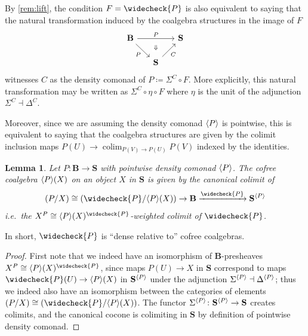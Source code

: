 \documentclass[11pt, oneside, article]{memoir}
\theoremstyle{plain}
\newtheorem{lemma}[theorem]{Lemma}
\theoremstyle{definition}
\theoremstyle{remark}
\newenvironment{remark}
{\renewcommand\qedsymbol{$\lrcorner$}%
  \pushQED{\qed}\myremark}
{\popQED\endmyremark}
\DeclareMathOperator*{\colim}{colim}
\DeclarePairedDelimiter{\gen}{\langle}{\rangle}
\newcommand{\xto}[1]{\xrightarrow{#1}}
\newcommand{\cat}[1]{\mathbf{#1}}
\newcommand{\CoalgOn}[2]{{#2}^{#1}}
\newcommand{\CoalgS}[1]{\CoalgOn{#1}{\bS}}
\newcommand{\lift}[1]{\widecheck{#1}}
\newcommand{\carr}{\Sigma}
\newcommand{\rcarr}{\Delta}
\newcommand{\car}[1]{\carr^{#1}}
\newcommand{\rcar}[1]{\rcarr^{#1}}
\newcommand{\carC}{\car{\cC}}
\newcommand{\rcarC}{\rcar{\cC}}
\newcommand{\carP}{\car{\cP}}
\newcommand{\rcarP}{\rcar{\cP}}
\newcommand{\ph}[1]{#1}
\newcommand{\cmnd}[1]{{#1}}
\newcommand{\xU}{U}
\newcommand{\xV}{V}
\newcommand{\xX}{X}
\newcommand{\cC}{\cmnd{C}}
\newcommand{\bB}{\cat{B}}
\newcommand{\bS}{\cat{S}}
\newcommand{\pP}{\ph{P}}
\newcommand{\cP}{\gen{\pP}}
\newcommand{\lP}{\lift{\pP}}
\newcommand{\CS}{\CoalgS{\cC}}
\newcommand{\PS}{\CoalgS{\cP}}
\begin{document}
\begin{remark}\label{rem:subbasismodule}
  By \cref{rem:lift}, the condition $F = \lP$ is also equivalent to
  saying that the
  natural transformation induced by the coalgebra structures in the
  image of $F$
  \[
    \begin{tikzcd}[column sep=15pt, row sep=15pt]
      {\bB} &{}& {\bS} \\
      & {\bS}
      \arrow["\pP", from=1-1, to=1-3]
      \arrow["\pP"', from=1-1, to=2-2]
      \arrow["\cC"', from=2-2, to=1-3]
      \arrow["\Downarrow"{description, pos=0.3}, draw=none, from=1-2, to=2-2]
    \end{tikzcd}
  \]
  witnesses $\cC$ as the density comonad of
  $\pP \coloneqq \carC \circ F$. More explicitly, this natural
  transformation may be written as $\carC \circ \eta \circ F$ where
  $\eta$ is the unit of the adjunction $\carC \dashv \rcarC$.

  Moreover, since we are assuming the density comonad $\cP$ is
  pointwise, this is equivalent to saying that the coalgebra
  structures are given by the colimit inclusion maps
  $\pP(\xU) \to \colim_{\pP(\xV) \to \pP(\xU)} \pP(\xV)$ indexed by
  the identities.
\end{remark}


\begin{lemma}\label{lem:cofreecolimit}
  Let $\pP \colon \bB \to \bS$ with pointwise density comonad
  $\cP$. The cofree coalgebra $\cP(\xX)$ on an object $\xX$ in $\bS$ is
  given by the canonical colimit of
  \[(\pP / \xX) \cong (\lP / \cP(\xX)) \to \bB \xto{\lP} \PS\] i.e.\
  the $\xX^\pP \cong \cP(\xX)^{\lP}$-weighted colimit of $\lP$.
\end{lemma}

\noindent
In short, $\lP$ is ``dense relative to'' cofree coalgebras.

\begin{proof}
  First note that we indeed have an isomorphism of $\bB$-presheaves
  $\xX^\pP \cong \cP(\xX)^{\lP}$, since maps $\pP(\xU) \to \xX$ in
  $\bS$ correspond to maps $\lP(\xU) \to \cP(\xX)$ in $\PS$ under the
  adjunction $\carP \dashv \rcarP$; thus we indeed also have an
  isomorphism between the categories of elements
  $(\pP / \xX) \cong (\lP / \cP(\xX))$. The functor
  $\carP \colon \PS \to \bS$ creates colimits, and the canonical
  cocone is colimiting in $\bS$ by definition of pointwise density
  comonad.
\end{proof}
\end{document}
